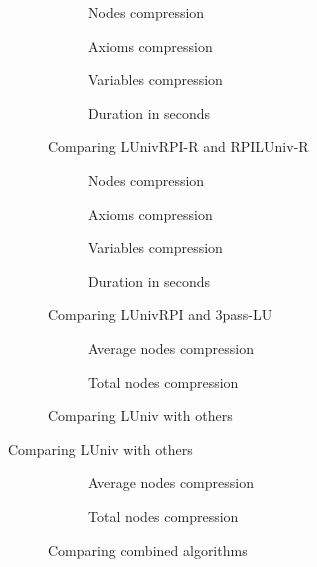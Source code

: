 \begin{figure}[hbt]
  \begin{subfigure}{0.5\textwidth}
    \centering
    \caption{Nodes compression}
  \end{subfigure}
  \begin{subfigure}{0.5\textwidth}
    \centering
    \caption{Axioms compression}
  \end{subfigure}
  \begin{subfigure}{0.5\textwidth}
    \centering
    \caption{Variables compression}
  \end{subfigure}
  \begin{subfigure}{0.5\textwidth}
    \centering
    \caption{Duration in seconds}
  \end{subfigure}
  \caption{Comparing LUnivRPI-R and RPILUniv-R}
\end{figure}
\begin{figure}[hbt]
  \begin{subfigure}{0.5\textwidth}
    \centering
    \caption{Nodes compression}
  \end{subfigure}
  \begin{subfigure}{0.5\textwidth}
    \centering
    \caption{Axioms compression}
  \end{subfigure}
  \begin{subfigure}{0.5\textwidth}
    \centering
    \caption{Variables compression}
  \end{subfigure}
  \begin{subfigure}{0.5\textwidth}
    \centering
    \caption{Duration in seconds}
  \end{subfigure}
  \caption{Comparing LUnivRPI and 3pass-LU}
\end{figure}
\begin{figure}[hbt]
  \begin{subfigure}{0.5\textwidth}
    \centering
    \caption{Average nodes compression}
  \end{subfigure}
  \begin{subfigure}{0.5\textwidth}
    \centering
    \caption{Total nodes compression}
  \end{subfigure}
  \caption{Comparing LUniv with others}
\end{figure}
\begin{table}[hbt]
  \centering
  \caption{Comparing LUniv with others}
\end{table}
\begin{figure}[hbt]
  \begin{subfigure}{0.5\textwidth}
    \centering
    \caption{Average nodes compression}
  \end{subfigure}
  \begin{subfigure}{0.5\textwidth}
    \centering
    \caption{Total nodes compression}
  \end{subfigure}
  \caption{Comparing combined algorithms}
\end{figure}
